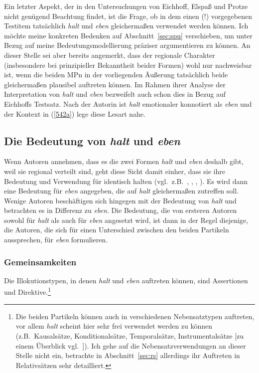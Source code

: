 Ein letzter Aspekt, der in den Untersuchungen von Eichhoff, Elspaß und Protze nicht genügend Beachtung findet, ist die Frage, ob in dem einen (!) vorgegebenen Testitem tatsächlich \textit{halt} und \textit{eben} gleichermaßen verwendet werden können. Ich möchte meine konkreten Bedenken auf Abschnitt~\ref{sec:spu} verschieben, um unter Bezug auf meine Bedeutungs\-modellierung präziser argumentieren zu können. An dieser Stelle sei aber bereits angemerkt, dass der regionale Charakter (insbesondere bei prinzipieller Bekanntheit beider Formen) wohl nur nachweisbar ist, wenn die beiden MPn in der vorliegenden Äußerung tatsächlich beide gleichermaßen plausibel auftreten können. Im Rahmen ihrer Analyse der Interpretation von \textit{halt} und \textit{eben} bezweifelt auch schon \citet[174]{Hentschel1986} dies in Bezug auf Eichhoffs Testsatz. Nach der Autorin ist \textit{halt} emotionaler konnotiert als \textit{eben} und der Kontext in (\ref{542a}) lege diese Lesart nahe.

\subsection{Die Bedeutung von \textit{halt} und \textit{eben}}
\label{sec:bedhe}
Wenn Autoren annehmen, dass es die zwei Formen \textit{halt} und \textit{eben} deshalb gibt, weil sie regional verteilt sind, geht diese Sicht damit einher, dass sie ihre Bedeutung und Verwendung für identisch halten (vgl.\ z.B.\ \citealt[10]{Becker1978}, \citealt[358]{Luetten1977}, \citealt[81]{Bublitz1978}, \citealt[202]{Karagjosova2004}). Es wird dann eine Bedeutung für \textit{eben} angegeben, die auf \textit{halt} gleichermaßen zutreffen soll. Wenige Autoren beschäftigen sich hingegen mit der Bedeutung von \textit{halt} und betrachten es in Differenz zu \textit{eben}. Die Bedeutung, die von ersteren Autoren sowohl für \textit{halt} als auch für \textit{eben} angesetzt wird, ist dann in der Regel diejenige, die Autoren, die sich für einen Unterschied zwischen den beiden Partikeln aussprechen, für \textit{eben} formulieren.

\subsubsection{Gemeinsamkeiten}
Die Illokutionstypen, in denen \textit{halt} und \textit{eben} auftreten können, sind Assertionen  und  Direktive.\footnote{Die beiden Partikeln können auch in verschiedenen Nebensatztypen auftreten, vor allem \textit{halt} scheint hier
sehr frei verwendet werden zu können (z.B.\ Kausalsätze, Konditionalsätze, Temporalsätze, Instrumentalsätze [zu einem Überblick vgl.\ \citealt[202--203]{Hentschel1986}]). Ich gehe auf die Nebensatzverwendungen an dieser Stelle nicht ein, betrachte in Abschnitt~\ref{sec:rs} allerdings ihr Auftreten in Relativsätzen sehr detailliert.}

